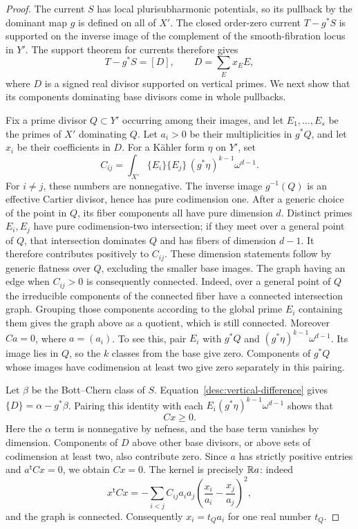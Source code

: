 \begin{proof}
The current $S$ has local plurisubharmonic potentials, so its pullback
by the dominant map $g$ is defined on all of $X'$.
The closed order-zero current $T-g^*S$ is supported on the inverse
image of the complement of the smooth-fibration locus in $Y'$.
The support theorem for currents
\cite[Chapter~III, Corollaries~2.11 and~2.14]{DemaillyCADG} therefore gives
\begin{equation}\label{desc:vertical-difference}
              T-g^*S=[D],\qquad D=\sum_E x_E E,
\end{equation}
where $D$ is a signed real divisor supported on vertical primes.
We next show that its components dominating base divisors come in
whole pullbacks.

Fix a prime divisor $Q\subset Y'$ occurring among their images, and
let $E_1,\ldots,E_s$ be the primes of $X'$ dominating $Q$.
Let $a_i>0$ be their multiplicities in $g^*Q$, and let $x_i$ be their
coefficients in $D$.  For a K\"ahler form $\eta$ on $Y'$, set
\begin{equation}\label{desc:intersection-matrix}
       C_{ij}=\int_{X'}\{E_i\}\{E_j\}\,(g^*\eta)^{k-1}\omega^{d-1}.
\end{equation}
For $i\ne j$, these numbers are nonnegative.
The inverse image $g^{-1}(Q)$ is an effective Cartier divisor, hence
has pure codimension one.  After a generic choice of the point in
$Q$, its fiber components all have pure dimension $d$.  Distinct
primes $E_i,E_j$ have pure codimension-two intersection; if they
meet over a general point of $Q$, that intersection dominates $Q$
and has fibers of dimension $d-1$.  It therefore contributes
positively to $C_{ij}$.  These dimension statements follow by
generic flatness over $Q$, excluding the smaller base images.
The graph having an edge when $C_{ij}>0$ is consequently connected.  Indeed, over a general point
of $Q$ the irreducible components of the connected fiber have a
connected intersection graph.  Grouping those components according
to the global prime $E_i$ containing them gives the graph above as
a quotient, which is still connected.  Moreover $Ca=0$, where
$a=(a_i)$.
To see this, pair $E_i$ with $g^*Q$ and $(g^*\eta)^{k-1}\omega^{d-1}$.
Its image lies in $Q$, so the $k$ classes from the base give zero.
Components of $g^*Q$ whose images have codimension at least two give
zero separately in this pairing.

Let $\beta$ be the Bott--Chern class of $S$.  Equation~\eqref{desc:vertical-difference} gives
$\{D\}=\alpha-g^*\beta$.  Pairing this identity with each
$E_i(g^*\eta)^{k-1}\omega^{d-1}$ shows that
\[
                               Cx\geq0.
\]
Here the $\alpha$ term is nonnegative by nefness, and the base term
vanishes by dimension.  Components of $D$ above other base divisors,
or above sets of codimension at least two, also contribute zero.
Since $a$ has strictly positive entries and $a^{\mathsf t}Cx=0$,
we obtain $Cx=0$.  The kernel is precisely $\mathbb R a$: indeed
\[
 x^{\mathsf t}Cx
 =-\sum_{i<j} C_{ij}a_i a_j
       \left(\frac{x_i}{a_i}-\frac{x_j}{a_j}\right)^2,
\]
and the graph is connected.  Consequently $x_i=t_Qa_i$ for one
real number $t_Q$.


\end{proof}
